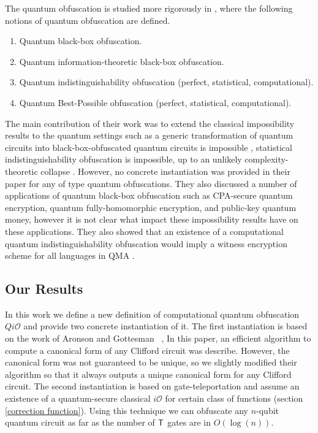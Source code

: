 The quantum obfuscation is studied more rigorously in \cite{AF16arxiv}, where the following notions of quantum obfuscation are defined.
\begin{enumerate}
\item Quantum black-box obfuscation.
\item Quantum information-theoretic black-box obfuscation.
\item Quantum indistinguishability obfuscation (perfect, statistical, computational).
\item Quantum Best-Possible obfuscation (perfect, statistical, computational).
\end{enumerate}

 The main contribution of their work was to extend the classical impossibility results to the quantum settings such as a generic transformation of quantum circuits into black-box-obfuscated quantum circuits is impossible \cite{},  statistical indistinguishability obfuscation is impossible, up to an unlikely complexity-theoretic collapse \cite{}. However, no concrete instantiation was provided in their paper for any of type quantum obfuscations. They also discussed a number of applications of quantum black-box obfuscation such as CPA-secure quantum encryption, quantum fully-homomorphic encryption, and public-key quantum money, however it is not clear what impact these impossibility results have on these applications. They also showed that an existence of a computational quantum indistinguishability obfuscation would imply a witness encryption scheme for all languages in QMA \cite{}.


\subsection{Our Results}

 In this work we define a new definition of computational quantum obfuscation $Qi\mathcal{O}$ and provide two concrete instantiation of it. The first instantiation is based on the work of Aronson and Gottesman ~\cite{AG04}, In this paper, an efficient algorithm to compute a canonical form of any Clifford circuit was describe. However, the canonical form was not guaranteed to be unique, so we slightly modified their algorithm so that it always outputs a unique canonical form for any Clifford circuit. The second instantiation is based on gate-teleportation \cite{} and assume an existence of a quantum-secure classical $i\mathcal{O}$ for certain class of functions (section \ref{correction function}). Using this technique we can obfuscate any $n$-qubit quantum circuit as far as the number of ${\sf T}$ gates are in $O(\log(n)).$






